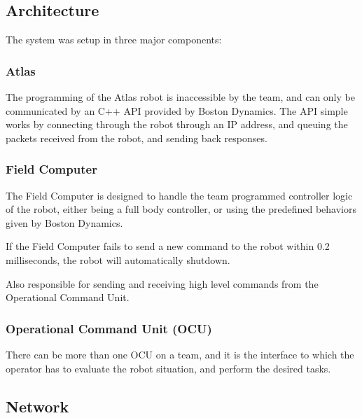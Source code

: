 \documentclass[12pt]{report}
\begin{document}
\subsection{Architecture}

The system was setup in three major components: 

\subsubsection{Atlas}
The programming of the Atlas robot is inaccessible by the team, and can only be communicated by an C++ API provided by Boston Dynamics. The API simple works by connecting through the robot through an IP address, and queuing the packets received from the robot, and sending back responses. 

\subsubsection{Field Computer}
The Field Computer is designed to handle the team programmed controller logic of the robot, either being a full body controller, or using the predefined behaviors given by Boston Dynamics. 

If the Field Computer fails to send a new command to the robot within 0.2 milliseconds, the robot will automatically shutdown. 

Also responsible for sending and receiving high level commands from the Operational Command Unit.

\subsubsection{Operational Command Unit (OCU)}

There can be more than one OCU on a team, and it is the interface to which the operator has to evaluate the robot situation, and perform the desired tasks. 



\subsection{Network}
\end{document}

